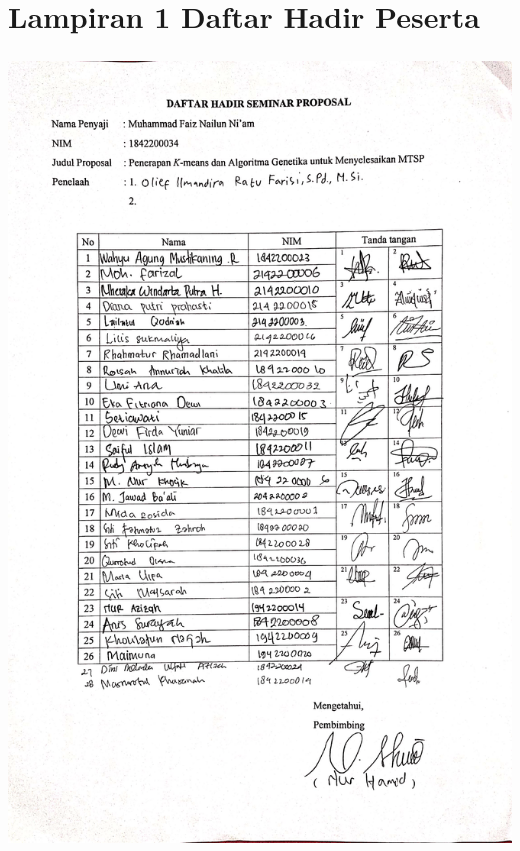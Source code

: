 \newpage
\thispagestyle{empty}

\section*{Lampiran 1 Daftar Hadir Peserta}

\includegraphics[height=21cm]{daftar_hadir_1.jpg} 

